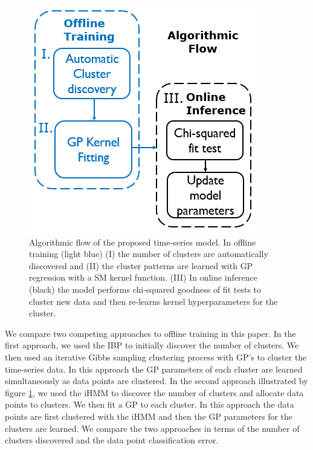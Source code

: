 \documentclass{article}
\begin{document}
\begin{figure}[ht]
\vskip 0.2in
\begin{center}
\centerline{\includegraphics[width=\columnwidth]{AlgFlow2}}
\caption{Algorithmic flow of the proposed time-series model. In offline training (light blue) (I) the number of clusters are automatically discovered and (II) the cluster patterns are learned with GP regression with a SM kernel function. (III) In online inference (black) the model performs chi-squared goodness of fit tests to cluster new data and then re-learns kernel hyperparameters for the cluster.}
\label{AlgFlow2}
\end{center}
\vskip -0.2in
\end{figure} 

We compare two competing approaches to offline training in this paper. In the first approach, we used the IBP to initially discover the number of clusters. We then used an iterative Gibbs sampling clustering process with GP's to cluster the time-series data. In this approach the GP parameters of each cluster are learned simultaneously as data points are clustered. In the second approach illustrated by figure \ref{AlgFlow2}, we used the iHMM to discover the number of clusters and allocate data points to clusters. We then fit a GP to each cluster. In this approach the data points are first clustered with the iHMM and then the GP parameters for the clusters are learned. We compare the two approaches in terms of the number of clusters discovered and the data point classification error.
\end{document}
